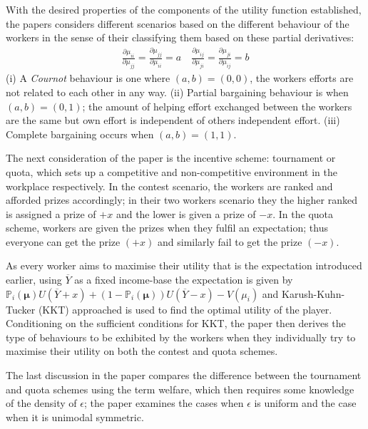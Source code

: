 \documentclass[a4paper,10pt]{article}
\theoremstyle{definition}
\begin{document}
With the desired properties of the components of the utility function established,  the papers considers different scenarios based on the different behaviour of the workers in the sense of their classifying them based on these partial derivatives:
\begin{align}
\frac{\partial\mu_{ii}}{\partial\mu_{jj}}=\frac{\partial\mu_{jj}}{\partial\mu_{ii}}=a\quad
\frac{\partial\mu_{ij}}{\partial\mu_{ji}}=\frac{\partial\mu_{ji}}{\partial\mu_{ij}}=b \label{eq:partiald}
\end{align}
(i) A \emph{Cournot} behaviour is one where $(a,b)=(0,0)$, the workers efforts are not related to each other in any way. (ii) Partial bargaining behaviour is when $(a,b)=(0,1)$; the amount of helping effort exchanged between the workers are the same but own effort is independent of others independent effort. (iii) Complete bargaining occurs when $(a,b)=(1,1)$.


The next consideration of the paper is the incentive scheme: tournament or quota, which sets up a competitive and non-competitive environment in the workplace respectively. In the contest scenario, the workers are ranked and afforded prizes accordingly; in their two workers scenario they the higher ranked is assigned a prize of $+x$ and the lower is given a prize of $-x$. In the quota scheme, workers are given the prizes when they fulfil an expectation; thus everyone can get the prize $(+x)$ and similarly fail to get the prize $(-x)$. 

As every worker aims to maximise their utility that is the expectation introduced earlier, using $\overline{Y}$ as a fixed income-base the expectation is given by $\mathbb{P}_i(\mathbf{\mu})U(\overline{Y}+x)+(1-\mathbb{P}_i(\mathbf{\mu}))U(\overline{Y}-x)-V(\mu_i)$
and Karush-Kuhn-Tucker (KKT) approached is used to find the optimal utility of the player. Conditioning on the sufficient conditions for KKT, the paper then derives the type of behaviours to be exhibited by the workers when they individually try to maximise their utility on both the contest and quota schemes.

The last discussion in the paper compares the difference between the tournament and quota schemes using the term welfare, which then requires some knowledge of the density of $\epsilon$; the paper examines the cases when $\epsilon$ is uniform and the case when it is unimodal symmetric.
\end{document}
